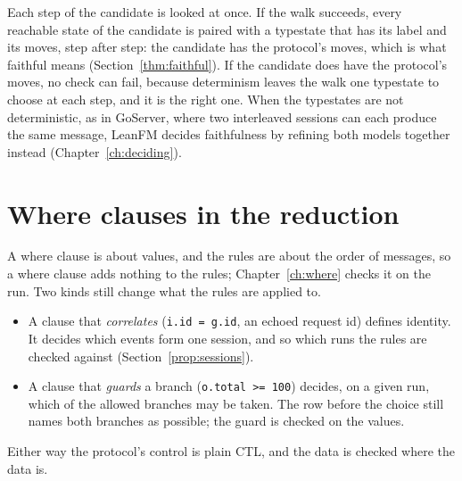 Each step of the candidate is looked at once. If the walk succeeds, every reachable state
of the candidate is paired with a typestate that has its label and its moves, step after
step: the candidate has the protocol's moves, which is what faithful means
(Section~\ref{thm:faithful}). If the candidate does have the protocol's moves, no check can
fail, because determinism leaves the walk one typestate to choose at each step, and it is
the right one.
When the typestates are not deterministic, as in GoServer, where two interleaved sessions
can each produce the same message, LeanFM decides faithfulness by refining both models
together instead (Chapter~\ref{ch:deciding}).

\section{Where clauses in the reduction}

A where clause is about values, and the rules are about the order of messages, so a where
clause adds nothing to the rules; Chapter~\ref{ch:where} checks it on the run. Two kinds
still change what the rules are applied to.

\begin{itemize}
\item A clause that \emph{correlates} (\texttt{i.id = g.id}, an echoed request id)
  defines identity. It decides which events form one session, and so which runs the rules
  are checked against (Section~\ref{prop:sessions}).
\item A clause that \emph{guards} a branch (\texttt{o.total >= 100}) decides, on a given
  run, which of the allowed branches may be taken. The row before the choice still names
  both branches as possible; the guard is checked on the values.
\end{itemize}

Either way the protocol's control is plain CTL, and the data is checked where the data is.
